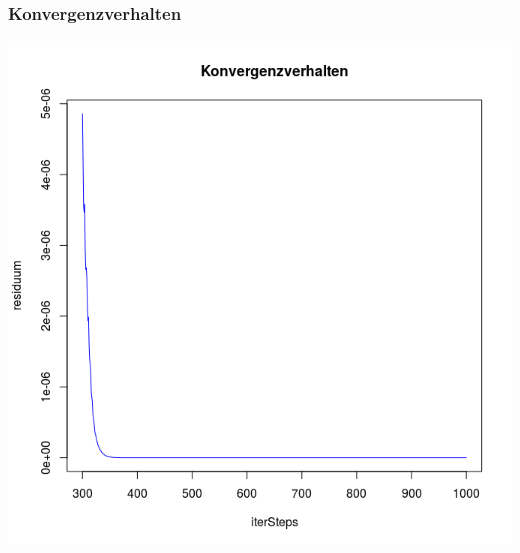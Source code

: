 \documentclass[]{beamer}
\begin{document}
\begin{frame}
\frametitle{Konvergenzverhalten} 
\begin{center}
\includegraphics[scale=0.33]{Konvergenzverhalten_300_1000.png}
\end{center}
\end{frame}
\end{document}
